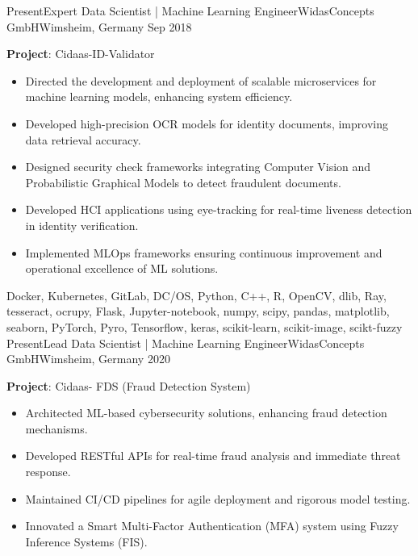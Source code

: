%
%
%
\begin{experiences}
	\experience
	{Present}{Expert Data Scientist | Machine Learning Engineer}{WidasConcepts GmbH}{Wimsheim, Germany}
	{Sep 2018} {
		\vspace{0.1cm}
		\textbf{Project}: Cidaas-ID-Validator
		\begin{itemize}
			\item Directed the development and deployment of scalable microservices for machine learning models, enhancing system efficiency.
			\item Developed high-precision OCR models for identity documents, improving data retrieval accuracy.
			\item Designed security check frameworks integrating Computer Vision and Probabilistic Graphical Models to detect fraudulent documents.
			\item Developed HCI applications using eye-tracking for real-time liveness detection in identity verification.
			\item Implemented MLOps frameworks ensuring continuous improvement and operational excellence of ML solutions.
		\end{itemize}
	}
	{Docker, Kubernetes, GitLab, DC/OS, Python, C++, R,  OpenCV, dlib, Ray, tesseract, ocrupy, Flask, Jupyter-notebook, numpy, scipy, pandas, matplotlib, seaborn, PyTorch, Pyro, Tensorflow, keras, scikit-learn, scikit-image, scikt-fuzzy}
	\emptySeparator
	\experience
	{Present}{Lead Data Scientist | Machine Learning Engineer}{WidasConcepts GmbH}{Wimsheim, Germany}
	{2020} {
		\vspace{0.1cm}
		\textbf{Project}: Cidaas- FDS (Fraud Detection System)
		\begin{itemize}
			\item Architected ML-based cybersecurity solutions, enhancing fraud detection mechanisms.
			\item Developed RESTful APIs for real-time fraud analysis and immediate threat response.
			\item Maintained CI/CD pipelines for agile deployment and rigorous model testing.
			\item Innovated a Smart Multi-Factor Authentication (MFA) system using Fuzzy Inference Systems (FIS).

\end{itemize}}
\end{experiences}
